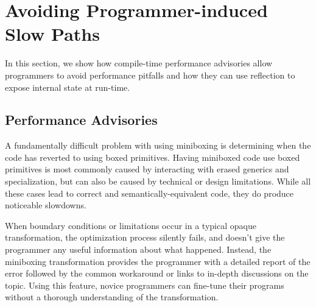 \section{Avoiding Programmer-induced Slow Paths}
\label{sec:advisories}

In this section, we show how compile-time performance advisories allow programmers to avoid performance pitfalls and how they can use reflection to expose internal state at run-time. %

\subsection{Performance Advisories}

A fundamentally difficult problem with using miniboxing is determining when the code has reverted to using boxed primitives. Having miniboxed code use boxed primitives is most commonly caused by interacting with erased generics and specialization, but can also be caused by technical or design limitations. While all these cases lead to correct and semantically-equivalent code, they do produce noticeable slowdowns. %

When boundary conditions or limitations occur in a typical opaque transformation, the optimization process silently fails, and doesn't give the programmer any useful information about what happened. Instead, the miniboxing transformation provides the programmer with a detailed report of the error followed by the common workaround or links to in-depth discussions on the topic. Using this feature, novice programmers can fine-tune their programs without a thorough understanding of the transformation. %

